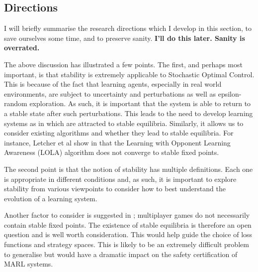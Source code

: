 \documentclass[preprint,11pt]{report}
\begin{document}
\subsection{Directions}


I will briefly summarise the research directions which I develop in this section, to save ourselves
some time, and to preserve sanity. \textbf{I'll do this later. Sanity is overrated.}

The above discussion has illustrated a few points. The first, and perhaps most important, is that
stability is extremely applicable to Stochastic Optimal Control. This is because of the fact
that learning agents, especially in real world environments, are subject to uncertainty and
perturbations as well as epsilon-random exploration. As such, it is important that the system is
able to return to a stable state after such perturbations. This leads to the need to develop
learning systems as in \cite{Letcher2019DifferentiableMechanics} which are attracted to stable
equilibria. Similarly, it allows us to consider existing algorithms and whether they lead to stable
equilibria. For instance, Letcher et al show in \cite{LetcherSTABLEGAMES} that the Learning with
Opponent Learning Awareness (LOLA) algorithm \cite{Foerster2018LearningAwareness} does not converge
to stable fixed points.

The second point is that the notion of stability has multiple definitions. Each one is appropriate
in different conditions and, as such, it is important to explore stability from various viewpoints
to consider how to best understand the evolution of a learning system. 

Another factor to consider is suggested in \cite{Milchtaich2007StaticGames}; multiplayer games do
not necessarily contain stable fixed points. The existence of stable equilibria is therefore an open
question and is well worth consideration. This would help guide the choice of loss functions and
strategy spaces. This is likely to be an extremely difficult problem to generalise but would have a
dramatic impact on the safety certification of MARL systems.
\end{document}
